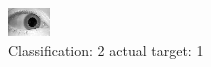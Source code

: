 \begin{figure}[h!]
\begin{center}
\includegraphics[width=0.60\columnwidth]{figures/ID1534_class_2_target_1.png}
\end{center}
\caption{ Classification: 2 actual target: 1}
\label{fig:ID1534_class_2_target_1}
\end{figure}
